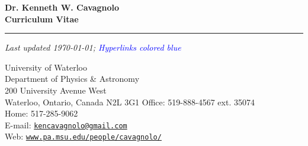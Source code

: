\documentclass[12pt]{cv}
\begin{document}
\begin{center}
{\large \textbf{Dr. Kenneth W. Cavagnolo\\Curriculum Vitae}}
\rule{17.35cm}{2pt}
\footnotesize
{\it Last updated \today; \textcolor{blue}{Hyperlinks colored blue}}
\normalsize
\end{center}

\addresses
{
University of Waterloo\\
Department of Physics \& Astronomy\\
200 University Avenue West\\
Waterloo, Ontario, Canada N2L 3G1
}
{
Office: 519-888-4567 ext. 35074\\
Home: 517-285-9062\\
E-mail: \href{mailto:kencavagnolo@gmail.com}{\tt{kencavagnolo@gmail.com}}\\
Web: \href{http://www.pa.msu.edu/people/cavagnolo/}{\tt www.pa.msu.edu/people/cavagnolo/}\\
}
\end{document}
